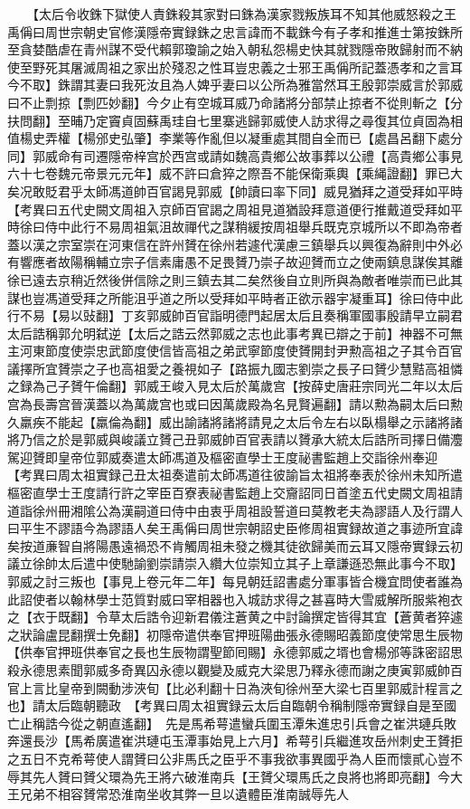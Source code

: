 　　【太后令收銖下獄使人責銖殺其家對曰銖為漢家戮叛族耳不知其他威怒殺之王禹偁曰周世宗朝史官修漢隱帝實録銖之忠言諱而不載銖今有子孝和推進士第按銖所至貪婪酷虐在青州謀不受代賴郭瓊諭之始入朝私怨楊史快其就戮隱帝敗歸射而不納使至野死其屠滅周祖之家出於殘忍之性耳豈忠義之士邪王禹偁所記蓋憑孝和之言耳今不取】銖謂其妻曰我死汝且為人婢乎妻曰以公所為雅當然耳王殷郭崇威言於郭威曰不止剽掠【剽匹妙翻】今夕止有空城耳威乃命諸將分部禁止掠者不從則斬之【分扶問翻】至晡乃定竇貞固蘇禹珪自七里寨逃歸郭威使人訪求得之尋復其位貞固為相值楊史弄權【楊邠史弘肇】李業等作亂但以凝重處其間自全而已【處昌呂翻下處分同】郭威命有司遷隱帝梓宫於西宫或請如魏高貴鄉公故事葬以公禮【高貴鄉公事見六十七卷魏元帝景元元年】威不許曰倉猝之際吾不能保衛乘輿【乘䋲證翻】罪已大矣况敢貶君乎太師馮道帥百官謁見郭威【帥讀曰率下同】威見猶拜之道受拜如平時　【考異曰五代史闕文周祖入京師百官謁之周祖見道猶設拜意道便行推戴道受拜如平時徐曰侍中此行不易周祖氣沮故禪代之謀稍緩按周祖舉兵既克京城所以不即為帝者蓋以漢之宗室崇在河東信在許州贇在徐州若遽代漢慮三鎮舉兵以興復為辭則中外必有響應者故陽稱輔立宗子信素庸愚不足畏贇乃崇子故迎贇而立之使兩鎮息謀俟其離徐已遠去京稍近然後併信除之則三鎮去其二矣然後自立則所與為敵者唯崇而已此其謀也豈馮道受拜之所能沮乎道之所以受拜如平時者正欲示器宇凝重耳】徐曰侍中此行不易【易以䜴翻】丁亥郭威帥百官詣明德門起居太后且奏稱軍國事殷請早立嗣君太后誥稱郭允明弑逆【太后之誥云然郭威之志也此事考異已辯之于前】神器不可無主河東節度使崇忠武節度使信皆高祖之弟武寧節度使贇開封尹勲高祖之子其令百官議擇所宜贇崇之子也高祖愛之養視如子【路振九國志劉崇之長子曰贇少慧黠高祖憐之録為己子贇午倫翻】郭威王峻入見太后於萬歲宫【按薛史唐莊宗同光二年以太后宫為長壽宫晉漢蓋以為萬歲宫也或曰因萬歲殿為名見賢遍翻】請以勲為嗣太后曰勲久羸疾不能起【羸倫為翻】威出諭諸將諸將請見之太后令左右以臥榻舉之示諸將諸將乃信之於是郭威與峻議立贇己丑郭威帥百官表請以贇承大統太后誥所司擇日備灋駕迎贇即皇帝位郭威奏遣太師馮道及樞密直學士王度祕書監趙上交詣徐州奉迎　【考異曰周太祖實録己丑太祖奏遣前太師馮道往彼諭旨太祖將奉表於徐州未知所遣樞密直學士王度請行許之宰臣百寮表祕書監趙上交齎詔同日首塗五代史闕文周祖請道詣徐州冊湘隂公為漢嗣道曰侍中由衷乎周祖設誓道曰莫教老夫為謬語人及行謂人曰平生不謬語今為謬語人矣王禹偁曰周世宗朝詔史臣修周祖實録故道之事迹所宜諱矣按道亷智自將陽愚遠禍恐不肯觸周祖未發之機其徒欲歸美而云耳又隱帝實録云初議立徐帥太后遣中使馳諭劉崇請崇入纘大位崇知立其子上章謙遜恐無此事今不取】郭威之討三叛也【事見上卷元年二年】每見朝廷詔書處分軍事皆合機宜問使者誰為此詔使者以翰林學士范質對威曰宰相器也入城訪求得之甚喜時大雪威解所服紫袍衣之【衣于既翻】令草太后誥令迎新君儀注蒼黄之中討論撰定皆得其宜【蒼黄者猝遽之狀論盧昆翻撰士免翻】初隱帝遣供奉官押班陽曲張永德賜昭義節度使常思生辰物【供奉官押班供奉官之長也生辰物謂聖節囘賜】永德郭威之壻也會楊邠等誅密詔思殺永德思素聞郭威多奇異囚永德以觀變及威克大梁思乃釋永德而謝之庚寅郭威帥百官上言比皇帝到闕動涉浹旬【比必利翻十日為浹旬徐州至大梁七百里郭威計程言之也】請太后臨朝聽政　【考異曰周太祖實録云太后自臨朝令稱制隱帝實録自是至國亡止稱誥今從之朝直遙翻】　先是馬希萼遣蠻兵圍玉潭朱進忠引兵會之崔洪璉兵敗奔還長沙【馬希廣遣崔洪璉屯玉潭事始見上六月】希萼引兵繼進攻岳州刺史王贇拒之五日不克希萼使人謂贇曰公非馬氏之臣乎不事我欲事異國乎為人臣而懷貳心豈不辱其先人贇曰贇父環為先王將六破淮南兵【王贇父環馬氏之良將也將即亮翻】今大王兄弟不相容贇常恐淮南坐收其弊一旦以遺體臣淮南誠辱先人
